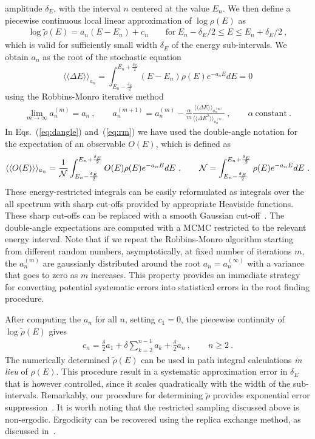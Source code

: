 \documentclass[a4paper]{jpconf}
\newcommand{\beq}{\begin{eqnarray}}
\newcommand{\eeq}{\end{eqnarray}}
\begin{document}
amplitude $\delta_E$, with the interval $n$ centered at the value
$E_n$. We then define a piecewise continuous local linear
approximation of $\log \rho(E)$ as  
\beq
\label{eq:piecewise}
\log \tilde{\rho}(E) = a_n \left(E - E_n \right) + c_n
\qquad \mathrm{for~} E_n - \delta_E/2 \le E \le E_n + \delta_E/2 \ ,
\eeq
which is valid for sufficiently small width $\delta_E$ of the energy
sub-intervals. We obtain $a_n$ as the root of the stochastic equation
\begin{equation}
\label{eq:dangle}
  \langle \langle \Delta E \rangle \rangle_{a_n}= \int_{E_n-\frac{\delta_E}{2}}^{E_n+\frac{\delta_E}{2}} \left(E - E_n \right) \rho(E) e^{-a_n E} dE = 0
\end{equation}
using the Robbins-Monro iterative method~\cite{Robbins:1951}
\beq
\label{eq:rm}
\lim_{m \to \infty} a^{(m)}_n  = a_n  \ , \qquad a^{(m+1)}_n=a^{(m)}_n
- \frac{\alpha}{m} \frac{\langle \langle \Delta E \rangle
  \rangle_{a^{(m)}_n}} {\langle \langle \Delta E ^2 \rangle
  \rangle_{a^{(m)}_n}} \ , \qquad \alpha \ \mathrm{constant} \ . 
\eeq
In Eqs.~(\ref{eq:dangle}) and~(\ref{eq:rm}) we have used the
double-angle notation for the expectation of an observable $O(E)$,
which is defined as
\beq
\langle \langle O(E) \rangle \rangle_{a_n}= \frac{1}{\cal N}
\int_{E_n-\frac{\delta_E}{2}}^{E_n+\frac{\delta_E}{2}} O(E) \rho(E)
e^{-a_n E} dE \ , \qquad {\cal N} = \int_{E_n-\frac{\delta_E}{2}}^{E_n+\frac{\delta_E}{2}} \rho(E)
e^{-a_n E} dE \ .  
\eeq
These energy-restricted integrals can be easily reformulated as integrals over the all
spectrum with sharp cut-offs provided by appropriate Heaviside
functions. These sharp cut-offs can be replaced with a smooth Gaussian cut-off~\cite{Pellegrini:2017iuy}. The double-angle expectations are computed with a MCMC
restricted to the relevant energy interval. Note that if we repeat the
Robbins-Monro algorithm starting from different random numbers,
asymptotically, at fixed number of iterations $m$,
the $a_n^{(m)}$ are gaussianly distributed
around the root $a_n = a_n^{(\infty)}$ with a variance
that goes to zero as $m$ increases. This property provides an immediate strategy 
for converting potential systematic errors into statistical errors in
the root finding procedure.

After computing the $a_n$ for all $n$, setting $c_1 = 0$, the
piecewise continuity of $\log \tilde{\rho}(E)$ gives
  \beq
  c_n =  \frac{\delta}{2} a_1+ \delta \sum_{k=2}^{n-1} a_k +
  \frac{\delta}{2} a_n  \ , \qquad n \ge 2 \ .
  \eeq
The numerically determined $\tilde{\rho}(E)$ can be used in path
integral calculations {\em in lieu} of $\rho(E)$. This procedure result
in a systematic approximation error in $\delta_E$ that is however
controlled, since it scales quadratically with the width of the
sub-intervals. Remarkably, our procedure for determining
$\tilde{\rho}$ provides exponential error
suppression~\cite{Langfeld:2015fua}. It is worth noting that the restricted 
sampling discussed above is non-ergodic. Ergodicity can be recovered using the replica
exchange method, as discussed in~\cite{Lucini:2016fid}. 
\end{document}
